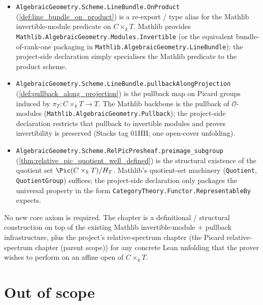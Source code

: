 \begin{itemize}
  \item \texttt{AlgebraicGeometry.Scheme.LineBundle.OnProduct}
    (\cref{def:line_bundle_on_product}) is a re-export / type alias for the
    Mathlib invertible-module predicate on \(C \times_k T\). Mathlib provides
    \texttt{Mathlib.AlgebraicGeometry.Modules.Invertible} (or the equivalent
    bundle-of-rank-one packaging in \texttt{Mathlib.AlgebraicGeometry.LineBundle});
    the project-side declaration simply specialises the Mathlib predicate to
    the product scheme.
  \item \texttt{AlgebraicGeometry.Scheme.LineBundle.pullbackAlongProjection}
    (\cref{def:pullback_along_projection}) is the pullback map on Picard
    groups induced by \(\pi_T : C \times_k T \to T\). The Mathlib backbone is
    the pullback of \(\mathcal{O}\)-modules
    (\texttt{Mathlib.AlgebraicGeometry.Pullback}); the project-side
    declaration restricts that pullback to invertible modules and proves
    invertibility is preserved (Stacks tag 01HH; one open-cover unfolding).
  \item \texttt{AlgebraicGeometry.Scheme.RelPicPresheaf.preimage\_subgroup}
    (\cref{thm:relative_pic_quotient_well_defined}) is the
    structural existence of the quotient set
    \(\Pic(C \times_k T)/H_T\). Mathlib's quotient-set machinery
    (\texttt{Quotient}, \texttt{QuotientGroup}) suffices; the project-side
    declaration only packages the universal property in the form
    \texttt{CategoryTheory.Functor.RepresentableBy} expects.
\end{itemize}

No new core axiom is required. The chapter is a definitional / structural
construction on top of the existing Mathlib invertible-module + pullback
infrastructure, plus the project's relative-spectrum chapter
(the Picard relative-spectrum chapter (parent scope)) for any concrete Lean unfolding that the
prover wishes to perform on an affine open of \(C \times_k T\).

\section{Out of scope}
\label{sec:lbp_out_of_scope}

